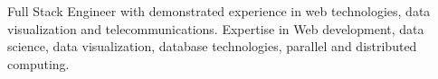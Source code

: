 

\begin{cvparagraph}


Full Stack Engineer with demonstrated experience in web technologies, data visualization and telecommunications.
Expertise in Web development, data science, data visualization, database technologies, parallel and distributed computing.
\end{cvparagraph}